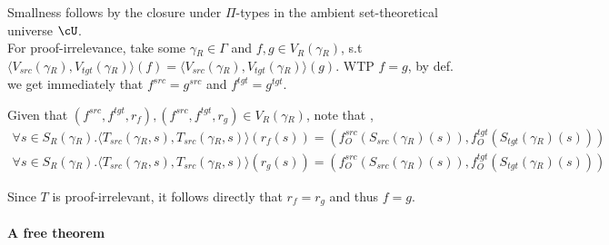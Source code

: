 \documentclass[12pt,a4paper]{article}
\def\src{_{src}}
\def\rfl{_{refl}}
\def\tgt{_{tgt}}
\renewcommand{\O}{_{O}}\alwaysmath{O}
\newcommand{\R}{\ensuremath{_{R}}}
\begin{document}
Smallness follows by the closure under $\Pi$-types in the ambient set-theoretical universe $\cU$.\\
For proof-irrelevance, take some $\gamma\R \in \Gamma$ and $f , g \in V\R(\gamma\R)$, s.t $\langle V\src(\gamma\R), V\tgt(\gamma\R) \rangle (f) = \langle V\src(\gamma\R), V\tgt(\gamma\R) \rangle (g)$. WTP $f = g$, by def. we get immediately that $f^{src} = g^{src}$ and $f^{tgt} = g^{tgt}$. 

Given that $(f^{src}, f^{tgt}, r_f), (f^{src}, f^{tgt}, r_g) \in V\R(\gamma\R)$, note that , 
\begin{align*}
  \forall s \in S\R(\gamma\R). \langle T\src(\gamma\R, s), T\src(\gamma\R, s) \rangle  ( r_f(s)) = (f\O^{src}(S\src(\gamma\R)(s)), f\O^{tgt}(S\tgt(\gamma\R)(s)))\\
  \forall s \in S\R(\gamma\R). \langle T\src(\gamma\R, s), T\src(\gamma\R, s) \rangle  ( r_g(s)) = (f\O^{src}(S\src(\gamma\R)(s)), f\O^{tgt}(S\tgt(\gamma\R)(s)))
\end{align*}

Since $T$ is proof-irrelevant, it follows directly that $r_f = r_g$ and thus $f = g$. 

\paragraph{A free theorem}
%
\end{document}
